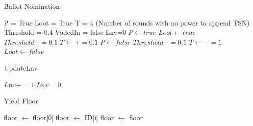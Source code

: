

\begin{algorithm}
\caption{Ballot Nomination}\label{alg:24}
\begin{algorithmic}
\scriptsize
\State P = True
\State Loot = True
\State T = 4   (Number of rounds with no power to append TSN)
\State Threshold = 0.4
\State VodedIn = false
\State Lnv=0
\State
{}
\State $P \leftarrow true$
\State $Loot \leftarrow true$
\State $Threshold += 0.1$
\State $T \leftarrow += 0.1$
\Else
{}
\State $P \leftarrow false$
\State $Threshold -= 0.1$
\State $T \leftarrow -= 1$
\EndIf
{}
\State $Loot \leftarrow false$
\EndIf
\EndIf
\end{algorithmic}
\end{algorithm}



\begin{algorithm}
\caption{UpdateLnv}\label{alg:25}
\begin{algorithmic}
\scriptsize
{}
\State $Lnv += 1$
\Else
\State $Lnv = 0$
\EndIf
\end{algorithmic}
\end{algorithm}



\begin{algorithm}
\caption{Yield Floor}\label{alg:26}
\begin{algorithmic}
\scriptsize
\State floor $\leftarrow$ floor[0]
\State floor $\leftarrow$ ID[i]
\Else
\State floor $\leftarrow$ floor
\EndIf
\EndWhile
\end{algorithmic}
\end{algorithm}


